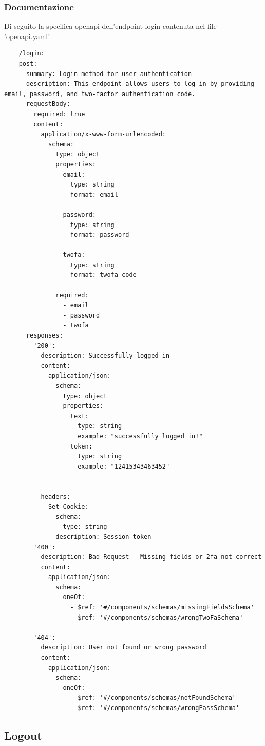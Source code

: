 \documentclass{report}
\begin{document}
\subsubsection*{Documentazione}
Di seguito la specifica openapi dell'endpoint login contenuta nel file 'openapi.yaml'
\begin{verbatim}
	/login:
    post:
      summary: Login method for user authentication
      description: This endpoint allows users to log in by providing email, password, and two-factor authentication code.
      requestBody:
        required: true
        content:
          application/x-www-form-urlencoded:
            schema:
              type: object
              properties:
                email:
                  type: string
                  format: email

                password:
                  type: string
                  format: password
                  
                twofa:
                  type: string
                  format: twofa-code
               
              required:
                - email
                - password
                - twofa
      responses:
        '200':
          description: Successfully logged in
          content:
            application/json:
              schema:
                type: object
                properties:
                  text:
                    type: string
                    example: "successfully logged in!"
                  token:
                    type: string
                    example: "12415343463452"
            

          headers:
            Set-Cookie:
              schema:
                type: string
              description: Session token
        '400':
          description: Bad Request - Missing fields or 2fa not correct
          content:
            application/json:
              schema:
                oneOf:
                  - $ref: '#/components/schemas/missingFieldsSchema'
                  - $ref: '#/components/schemas/wrongTwoFaSchema'
      
        '404':
          description: User not found or wrong password
          content:
            application/json:
              schema:
                oneOf:
                  - $ref: '#/components/schemas/notFoundSchema'
                  - $ref: '#/components/schemas/wrongPassSchema'
\end{verbatim}
\subsection{Logout}
\end{document}
